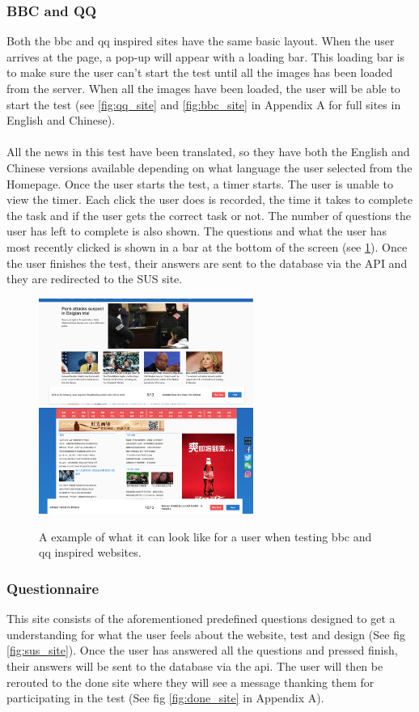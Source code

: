 \subsubsection{BBC and QQ}
Both the bbc and qq inspired sites have the same basic layout. When the user arrives at the page, a pop-up will appear with a loading bar. This loading bar is to make sure the user can't start the test until all the images has been loaded from the server. When all the images have been loaded, the user will be able to start the test (see \ref{fig:qq_site} and \ref{fig:bbc_site} in Appendix A for full sites in English and Chinese).  
\\\\
All the news in this test have been translated, so they have both the English and Chinese versions available depending on what language the user selected from the Homepage. Once the user starts the test, a timer starts. The user is unable to view the timer. Each click the user does is recorded, the time it takes to complete the task and if the user gets the correct task or not. The number of questions the user has left to complete is also shown. The questions and what the user has most recently clicked is shown in a bar at the bottom of the screen (see \ref{fig:user_view}). Once the user finishes the test, their answers are sent to the database via the API and they are redirected to the SUS site. 
\begin{figure}[h]
	\centering
	\includegraphics[width=70mm]{Images/view_bbc.png}
	\includegraphics[width=70mm]{Images/view_qq.png}
	\decoRule
	\caption[Users View]{A example of what it can look like for a user when testing bbc and qq inspired websites.}
	\label{fig:user_view}
\end{figure}


\subsubsection{Questionnaire}
This site consists of the aforementioned predefined questions designed to get a understanding for what the user feels about the website, test and design (See fig \ref{fig:sus_site}). Once the user has answered all the questions and pressed finish, their answers will be sent to the database via the api. The user will then be rerouted to the done site where they will see a message thanking them for participating in the test (See fig \ref{fig:done_site} in Appendix A).
\newpage


